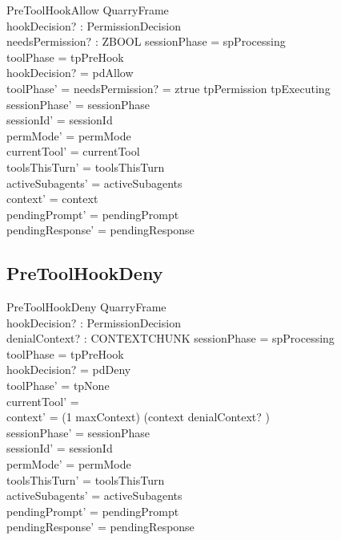 \documentclass[a4paper,10pt,fleqn]{article}
\begin{document}
\begin{schema}{PreToolHookAllow}
  QuarryFrame \\
  hookDecision? : PermissionDecision \\
  needsPermission? : ZBOOL
  \where
  sessionPhase = spProcessing \\
  toolPhase = tpPreHook \\
  hookDecision? = pdAllow \\
  toolPhase' = \IF needsPermission? = ztrue \THEN tpPermission \ELSE tpExecuting \\
  sessionPhase' = sessionPhase \\
  sessionId' = sessionId \\
  permMode' = permMode \\
  currentTool' = currentTool \\
  toolsThisTurn' = toolsThisTurn \\
  activeSubagents' = activeSubagents \\
  context' = context \\
  pendingPrompt' = pendingPrompt \\
  pendingResponse' = pendingResponse
\end{schema}

\subsection{PreToolHookDeny}

\begin{schema}{PreToolHookDeny}
  QuarryFrame \\
  hookDecision? : PermissionDecision \\
  denialContext? : CONTEXTCHUNK
  \where
  sessionPhase = spProcessing \\
  toolPhase = tpPreHook \\
  hookDecision? = pdDeny \\
  toolPhase' = tpNone \\
  currentTool' = \emptyset \\
  context' = (1 \upto maxContext) \dres (context \cat \langle denialContext? \rangle) \\
  sessionPhase' = sessionPhase \\
  sessionId' = sessionId \\
  permMode' = permMode \\
  toolsThisTurn' = toolsThisTurn \\
  activeSubagents' = activeSubagents \\
  pendingPrompt' = pendingPrompt \\
  pendingResponse' = pendingResponse
\end{schema}
\end{document}
